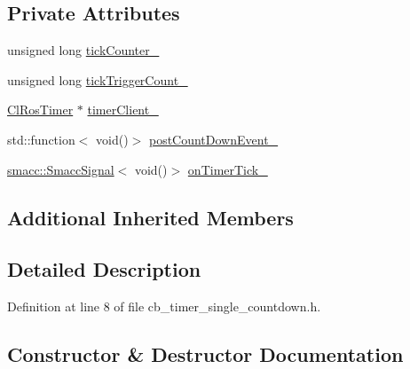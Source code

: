 \subsection*{Private Attributes}
\begin{DoxyCompactItemize}
\item 
unsigned long \hyperlink{classros__timer__client_1_1CbTimerSingleCountdown_a49fdd585034d79ada6a788661e83c456}{tick\+Counter\+\_\+}
\item 
unsigned long \hyperlink{classros__timer__client_1_1CbTimerSingleCountdown_a42b648f3b03508443b44b150cf7246f5}{tick\+Trigger\+Count\+\_\+}
\item 
\hyperlink{classros__timer__client_1_1ClRosTimer}{Cl\+Ros\+Timer} $\ast$ \hyperlink{classros__timer__client_1_1CbTimerSingleCountdown_aacb6539b70c5a2cbb6c410dc2faf814e}{timer\+Client\+\_\+}
\item 
std\+::function$<$ void()$>$ \hyperlink{classros__timer__client_1_1CbTimerSingleCountdown_a41f6a4f04199527ddfc551345d2367d0}{post\+Count\+Down\+Event\+\_\+}
\item 
\hyperlink{classsmacc_1_1SmaccSignal}{smacc\+::\+Smacc\+Signal}$<$ void()$>$ \hyperlink{classros__timer__client_1_1CbTimerSingleCountdown_afe2cb62b4a24108c637cb955a0957bd1}{on\+Timer\+Tick\+\_\+}
\end{DoxyCompactItemize}
\subsection*{Additional Inherited Members}


\subsection{Detailed Description}


Definition at line 8 of file cb\+\_\+timer\+\_\+single\+\_\+countdown.\+h.



\subsection{Constructor \& Destructor Documentation}
